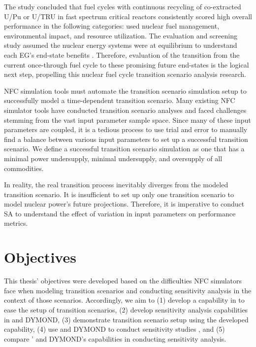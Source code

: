 The study concluded that fuel cycles with continuous recycling
of co-extracted U/Pu or U/TRU in fast spectrum critical reactors
consistently scored high overall performance in the following 
categories: used nuclear fuel management, environmental impact, 
and resource utilization. 
The evaluation and screening study assumed
the nuclear energy systems were at equilibrium to understand each \gls{EG}'s
end-state benefits \cite{feng_standardized_2016}. 
Therefore, evaluation of the transition from the current 
once-through fuel cycle to these promising 
future end-states \cite{feng_standardized_2016} 
is the logical next step, propelling this
nuclear fuel cycle transition scenario analysis research. 

\gls{NFC} simulation tools must automate the transition scenario simulation 
setup to successfully model a time-dependent transition scenario. 
Many existing \gls{NFC} simulator tools have conducted 
transition scenario analyses 
\cite{feng_standardized_2016,bae_standardized_2019,coquelet-pascal_cosi6:_2015}
and faced challenges stemming from the vast input parameter
sample space.
Since many of these input parameters are coupled, it is 
a tedious process to use trial and error to manually find a balance 
between various input parameters to set up a successful transition 
scenario. 
We define a successful transition scenario simulation as one that 
has a minimal power undersupply, minimal undersupply, 
and oversupply of all commodities. 
 
In reality, the real transition process inevitably diverges
from the modeled transition scenario. 
It is insufficient to set up only one transition scenario to model 
nuclear power's future projections.
Therefore, it is imperative to conduct \gls{SA} to understand 
the effect of variation in input parameters on 
performance metrics. 

\section{Objectives}
This thesis' objectives were developed based on the difficulties 
\gls{NFC} simulators face when modeling transition scenarios 
and conducting sensitivity analysis in the context of those scenarios.
Accordingly, we aim to 
(1) develop a capability in \Cyclus to ease the setup of 
transition scenarios, 
(2) develop sensitivity analysis capabilities in \Cyclus and DYMOND, 
(3) demonstrate \Cyclus transition scenario setup using the 
developed capability,
(4) use \Cyclus and DYMOND to conduct sensitivity studies
, and
(5) compare \Cyclus' and DYMOND's capabilities in conducting sensitivity 
analysis. 
